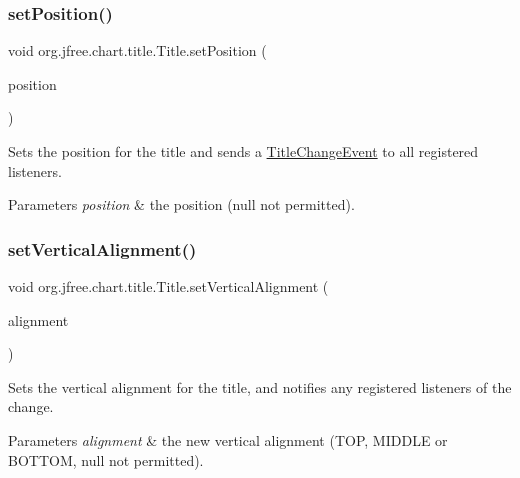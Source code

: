 \subsubsection{\texorpdfstring{set\+Position()}{setPosition()}}
{\footnotesize\ttfamily void org.\+jfree.\+chart.\+title.\+Title.\+set\+Position (\begin{DoxyParamCaption}\item[{Rectangle\+Edge}]{position }\end{DoxyParamCaption})}

Sets the position for the title and sends a \mbox{\hyperlink{}{Title\+Change\+Event}} to all registered listeners.


\begin{DoxyParams}{Parameters}
{\em position} & the position ({\ttfamily null} not permitted). \\
\hline
\end{DoxyParams}
\mbox{\label{classorg_1_1jfree_1_1chart_1_1title_1_1_title_ad604152c0c53db22105798159f43b50c}} 
\subsubsection{\texorpdfstring{set\+Vertical\+Alignment()}{setVerticalAlignment()}}
{\footnotesize\ttfamily void org.\+jfree.\+chart.\+title.\+Title.\+set\+Vertical\+Alignment (\begin{DoxyParamCaption}\item[{Vertical\+Alignment}]{alignment }\end{DoxyParamCaption})}

Sets the vertical alignment for the title, and notifies any registered listeners of the change.


\begin{DoxyParams}{Parameters}
{\em alignment} & the new vertical alignment (T\+OP, M\+I\+D\+D\+LE or B\+O\+T\+T\+OM, {\ttfamily null} not permitted). \\
\hline
\end{DoxyParams}
\mbox{\label{classorg_1_1jfree_1_1chart_1_1title_1_1_title_a03df402dfe058a11ab83af3e158a5e2a}} 
